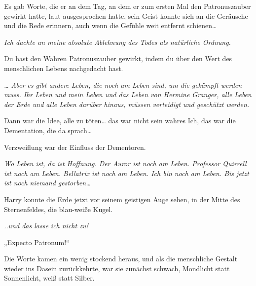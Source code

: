 Es gab Worte, die er an dem Tag, an dem er zum ersten Mal den Patronuszauber gewirkt hatte, laut ausgesprochen hatte, sein Geist konnte sich an die Geräusche und die Rede erinnern, auch wenn die Gefühle weit entfernt schienen…

\emph{Ich dachte an meine absolute Ablehnung des Todes als natürliche Ordnung.}

Du hast den Wahren Patronuszauber gewirkt, indem du über den Wert des menschlichen Lebens nachgedacht hast.

\emph{… Aber es gibt andere Leben, die noch am Leben sind, um die gekämpft werden muss. Ihr Leben und mein Leben und das Leben von Hermine Granger, alle Leben der Erde und alle Leben darüber hinaus, müssen verteidigt und geschützt werden.}

Dann war die Idee, alle zu töten… das war nicht sein wahres Ich, das war die Dementation, die da sprach…

Verzweiflung war der Einfluss der Dementoren.

\emph{Wo Leben ist, da ist Hoffnung. Der Auror ist noch am Leben. Professor Quirrell ist noch am Leben. Bellatrix ist noch am Leben. Ich bin noch am Leben. Bis jetzt ist noch niemand gestorben…}

Harry konnte die Erde jetzt vor seinem geistigen Auge sehen, in der Mitte des Sternenfeldes, die blau-weiße Kugel.

\emph{..und das lasse ich nicht zu!}

„Expecto Patronum!“

Die Worte kamen ein wenig stockend heraus, und als die menschliche Gestalt wieder ins Dasein zurückkehrte, war sie zunächst schwach, Mondlicht statt Sonnenlicht, weiß statt Silber.

